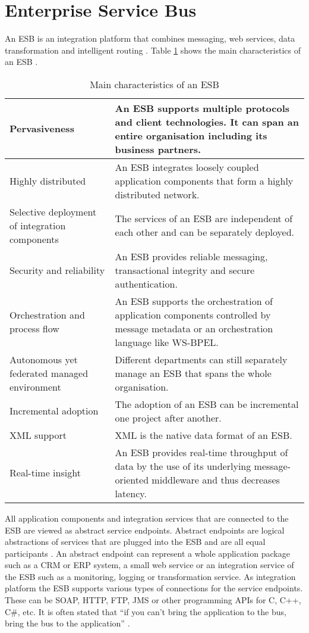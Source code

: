 \section{Enterprise Service Bus}
An \ac{ESB} is an integration platform that combines messaging, web services, data transformation and intelligent routing \citep{Schulte:2002mz}.
Table \ref{tab:char_esb} shows the main characteristics of an ESB \citep{Chappell:2004jo}.
\begin{table}[htbp]
	\centering
	\begin{tabular}{|p{}|p{}|}
		\hline
		Pervasiveness & An ESB supports multiple protocols and client technologies. It can span an entire organisation including its business partners. \\ \hline
		Highly distributed & An ESB integrates loosely coupled application components that form a highly distributed network. \\ \hline
		Selective deployment of integration components & The services of an ESB are independent of each other and can be separately deployed. \\ \hline
		Security and reliability & An ESB provides reliable messaging, transactional integrity and secure authentication. \\ \hline
		Orchestration and process flow & An ESB supports the orchestration of application components controlled by message metadata or an orchestration language like WS-BPEL. \\ \hline
		Autonomous yet federated managed environment & Different departments can still separately manage an ESB that spans the whole organisation. \\ \hline
		Incremental adoption & The adoption of an ESB can be incremental one project after another. \\ \hline
		XML support & XML is the native data format of an ESB. \\ \hline
		Real-time insight & An ESB provides real-time throughput of data by the use of its underlying message-oriented middleware and thus decreases latency. \\
		\hline
	\end{tabular}
	\caption{Main characteristics of an ESB \citep{Chappell:2004jo}}
	\label{tab:char_esb}
\end{table}
All application components and integration services that are connected to the ESB are viewed as abstract service endpoints. Abstract endpoints are logical abstractions of services that are plugged into the ESB and are all equal participants \citep{Chappell:2004jo}. An abstract endpoint can represent a whole application package such as a CRM or ERP system, a small web service or an integration service of the ESB such as a monitoring, logging or transformation service. As integration platform the ESB supports various types of connections for the service endpoints. These can be SOAP, HTTP, FTP, JMS or other programming APIs for C, C++, C\#, etc. It is often stated that ``if you can't bring the application to the bus, bring the bus to the application'' \citep{Chappell:2004jo}.

